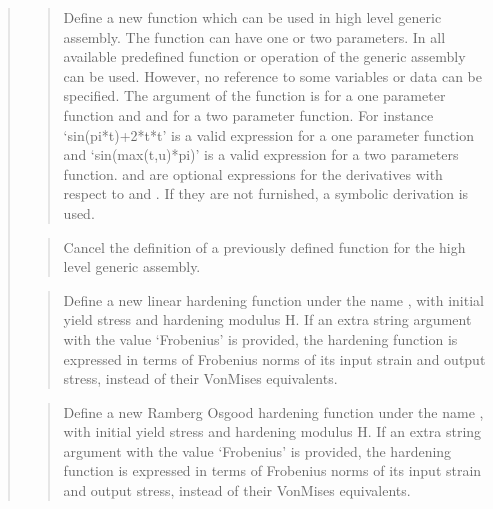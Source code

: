 \documentclass[a4paper,11pt,english]{sphinxmanual}
\begin{document}
\begin{quote}
\begin{quote}
Define a new function  which can be used in high level
generic assembly. The function can have one or two parameters.
In  all available predefined function or operation
of the generic assembly can be used. However, no reference to
some variables or data can be specified. The argument of the
function is  for a one parameter function and  and 
for a two parameter function. For instance ‘sin(pi*t)+2*t*t’
is a valid expression for a one parameter function and
‘sin(max(t,u)*pi)’ is a valid expression for a two parameters
function.  and 
are optional expressions for the derivatives with respect
to  and . If they are not furnished, a symbolic derivation
is used.
\end{quote}

\begin{quote}

Cancel the definition of a previously defined function 
for the high level generic assembly.
\end{quote}

\begin{quote}

Define a new linear hardening function under the name , with
initial yield stress  and hardening modulus H.
If an extra string argument with the value ‘Frobenius’ is provided,
the hardening function is expressed in terms of Frobenius norms of its
input strain and output stress, instead of their Von\sphinxhyphen{}Mises equivalents.
\end{quote}

\begin{quote}

Define a new Ramberg Osgood hardening function under the name ,
with initial yield stress  and hardening modulus H.
If an extra string argument with the value ‘Frobenius’ is provided,
the hardening function is expressed in terms of Frobenius norms of its
input strain and output stress, instead of their Von\sphinxhyphen{}Mises equivalents.
\end{quote}


\end{quote}
\end{document}
